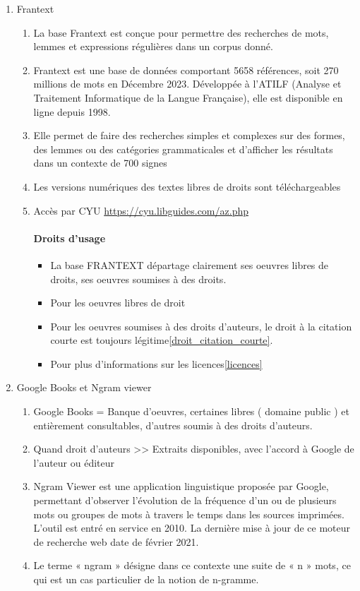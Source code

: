 \documentclass{book}
\newenvironment{titlemize}[1]{%
  \paragraph{#1}
  \begin{itemize}}
  {\end{itemize}}
\begin{document}
\begin{enumerate}
	\item Frantext 
        \begin{enumerate}
            \item La base Frantext est conçue pour permettre des recherches de mots, lemmes et expressions régulières dans un corpus donné.
            \item Frantext est une base de données comportant 5658 références, soit 270 millions de mots en Décembre 2023. Développée à l’ATILF (Analyse et Traitement Informatique de la Langue Française), elle est disponible en ligne depuis 1998.
            \item Elle permet de faire des recherches simples et complexes sur des formes, des lemmes ou des catégories grammaticales et d’afficher les résultats dans un contexte de 700 signes
            \item Les versions numériques des textes libres de droits sont téléchargeables
            \item Accès par CYU \url{https://cyu.libguides.com/az.php}
            
             \begin{titlemize}{Droits d'usage}
                \item La base FRANTEXT départage clairement ses oeuvres libres de droits, ses oeuvres soumises à des droits.
                \item Pour les oeuvres libres de droit
                \item Pour les oeuvres soumises à des droits d'auteurs, le droit à la citation courte est toujours légitime\ref{droit_citation_courte}. 
                \item Pour plus d'informations sur les licences\ref{licences}
	      	\end{titlemize}

        \end{enumerate}
    \item Google Books et Ngram viewer %
    
        \begin{enumerate}
        
            \item Google Books = Banque d'oeuvres, certaines libres ( domaine public ) et entièrement consultables, d'autres soumis à des droits d'auteurs. 
            \item Quand droit d'auteurs >> Extraits disponibles, avec l'accord à Google de l'auteur ou éditeur
            \item Ngram Viewer est une application linguistique proposée par Google, permettant d’observer l’évolution de la fréquence d’un ou de plusieurs mots ou groupes de mots à travers le temps dans les sources imprimées. L’outil est entré en service en 2010. La dernière mise à jour de ce moteur de recherche web date de février 2021.
            \item Le terme « ngram » désigne dans ce contexte une suite de « n » mots, ce qui est un cas particulier de la notion de n-gramme.


\end{enumerate}
\end{enumerate}
\end{document}
